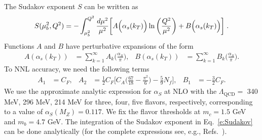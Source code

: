 \documentclass[aps,preprintnumbers,showpacs,nofootinbib,superscriptaddress,floatfix]{revtex4}
\newcommand{\bT}{\zeta_T}
\begin{document}
The Sudakov exponent $S$ 
can be written as
\begin{equation} 
S(\mu_b^2,Q^2)=-\int_{\mu_b^2}^{Q^2}{d\mu^2\over \mu^2}
\bigg[A\Big(\alpha_s(k_T)\Big)\ln\bigg({Q^2\over \mu^2}\bigg) 
+ B\Big(\alpha_s(k_T)\Big) \bigg] \;.
\label{e:Sudakov} 
\end{equation} 
Functions $A$ and $B$ have perturbative expansions of the form
\begin{align}
A\left(\alpha_s(k_T)\right) &= \sum_{k=1}^{\infty}A_k
\bigg(\frac{\alpha_S}{\pi} \bigg),
&
B\left(\alpha_s(k_T)\right) &= \sum_{k=1}^{\infty}B_k
\bigg(\frac{\alpha_S}{\pi} \bigg).
\end{align} 
To NNL accuracy, we need the following 
terms~\cite{Davies:1984hs,Collins:1984kg}
\begin{align}
A_1&= C_F, 
&
A_2&=
\frac{1}{2} C_F  \bigg[
C_A \bigg( \frac{67}{18} - \frac{\pi^2}{6} \bigg)
- \frac{5}{9} N_f \bigg],
&
B_1&= - \frac{3}{2}C_F.
\end{align} 
We use the approximate analytic expression for $\alpha_S$ at NLO with the
$\Lambda_{\text{QCD}}=$ 340 MeV, 296 MeV, 214 MeV for three, four, five
flavors, respectively, corresponding to a value of $\alpha_S(M_Z)=0.117$. 
We fix the flavor thresholds at $m_c=1.5$ GeV and 
$m_b= 4.7$ GeV. The integration of the Sudakov exponent in
Eq.~\eqref{e:Sudakov} can
be done analytically (for the complete expressions see, e.g.,
Refs.~\cite{Frixione:1998dw,Bozzi:2005wk,Echevarria:2012pw}).  


\end{document}
